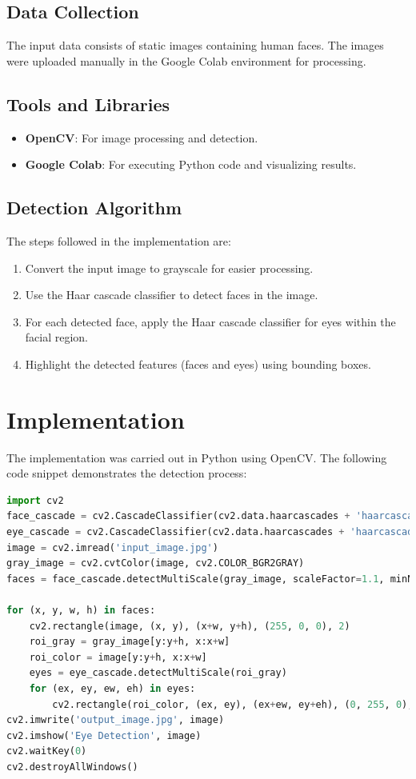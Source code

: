 \documentclass{report}
\begin{document}
\subsection{Data Collection}
The input data consists of static images containing human faces. The images were uploaded manually in the Google Colab environment for processing.

\subsection{Tools and Libraries}
\begin{itemize}
    \item \textbf{OpenCV}: For image processing and detection.
    \item \textbf{Google Colab}: For executing Python code and visualizing results.
\end{itemize}

\subsection{Detection Algorithm}
The steps followed in the implementation are:
\begin{enumerate}
    \item Convert the input image to grayscale for easier processing.
    \item Use the Haar cascade classifier to detect faces in the image.
    \item For each detected face, apply the Haar cascade classifier for eyes within the facial region.
    \item Highlight the detected features (faces and eyes) using bounding boxes.
\end{enumerate}

\section{Implementation}
The implementation was carried out in Python using OpenCV. The following code snippet demonstrates the detection process:

\begin{lstlisting}[language=Python, caption=Eye Detection Code, label=code:eye-detection]
import cv2
face_cascade = cv2.CascadeClassifier(cv2.data.haarcascades + 'haarcascade_frontalface_default.xml')
eye_cascade = cv2.CascadeClassifier(cv2.data.haarcascades + 'haarcascade_eye.xml')
image = cv2.imread('input_image.jpg')
gray_image = cv2.cvtColor(image, cv2.COLOR_BGR2GRAY)
faces = face_cascade.detectMultiScale(gray_image, scaleFactor=1.1, minNeighbors=5)

for (x, y, w, h) in faces:
    cv2.rectangle(image, (x, y), (x+w, y+h), (255, 0, 0), 2)
    roi_gray = gray_image[y:y+h, x:x+w]
    roi_color = image[y:y+h, x:x+w]
    eyes = eye_cascade.detectMultiScale(roi_gray)
    for (ex, ey, ew, eh) in eyes:
        cv2.rectangle(roi_color, (ex, ey), (ex+ew, ey+eh), (0, 255, 0), 2)
cv2.imwrite('output_image.jpg', image)
cv2.imshow('Eye Detection', image)
cv2.waitKey(0)
cv2.destroyAllWindows()
\end{lstlisting}
\end{document}
